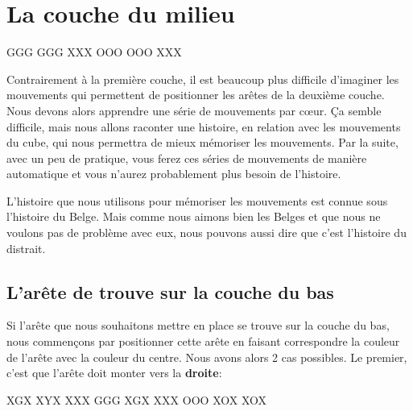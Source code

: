 \chapter{La couche du milieu}

{
	\centering
	\RubikFaceRight%
	{G}{G}{G}%
	{G}{G}{G}%
	{X}{X}{X}
	\RubikFaceFront%
	{O}{O}{O}%
	{O}{O}{O}%
	{X}{X}{X}
	\par
}
\medskip

Contrairement à la première couche, il est beaucoup plus difficile d'imaginer les mouvements qui permettent de positionner les arêtes de la deuxième couche. Nous devons alors apprendre une série de mouvements par cœur. Ça semble difficile, mais nous allons raconter une histoire, en relation avec les mouvements du cube, qui nous permettra de mieux mémoriser les mouvements. Par la suite, avec un peu de pratique, vous ferez ces séries de mouvements de manière automatique et vous n'aurez probablement plus besoin de l'histoire.  

L'histoire que nous utilisons pour mémoriser les mouvements est connue sous \og{}l'histoire du Belge\fg{}. Mais comme nous aimons bien les Belges et que nous ne voulons pas de problème avec eux, nous pouvons aussi dire que c'est \og{}l'histoire du distrait\fg{}.

\section{L'arête de trouve sur la couche du bas}\label{subsec:c21}

Si l'arête que nous souhaitons mettre en place se trouve sur la couche du bas, nous commençons par positionner cette arête en faisant correspondre la couleur de l'arête avec la couleur du centre. Nous avons alors 2 cas possibles. Le premier, c'est que l'arête doit \og{}monter\fg{} vers la \textbf{droite}:
\smallskip

\begin{center}
	\RubikFaceDown%
	{X}{G}{X}%
	{X}{Y}{X}%
	{X}{X}{X}
	\RubikFaceRight%
	{G}{G}{G}%
	{X}{G}{X}%
	{X}{X}{X}
	\RubikFaceFront%
	{O}{O}{O}%
	{X}{O}{X}%
	{X}{O}{X}
\end{center}
\smallskip

